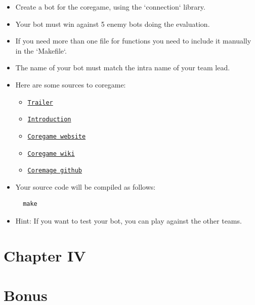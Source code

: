\documentclass[12pt]{article}
\begin{document}
\begin{itemize}
  \item Create a bot for the coregame, using the `connection` library.
  
  \item Your bot must win against 5 enemy bots doing the evaluation.
  
  \item If you need more than one file for functions you need to include it manually in the `Makefile`.
  
  \item The name of your bot must match the intra name of your team lead.
  
  \item Here are some sources to coregame:
  \begin{itemize}
    \item \href{https://youtu.be/gMmBgHnb8Nc?si=Thm0HOCfNIZbfCnI}{\texttt{Trailer}}
    \item \href{https://shattereddisk.github.io/rickroll/rickroll.mp4}{\texttt{Introduction}}
    \item \href{https://coregame.de}{\texttt{Coregame website}}
    \item \href{https://wiki.coregame.de}{\texttt{Coregame wiki}}
    \item \href{https://github.com/42core-team}{\texttt{Coremage github}}
  \end{itemize}
  
  \item Your source code will be compiled as follows:
  
  \begin{verbatim}
  make
  \end{verbatim}
  
  \item Hint: If you want to test your bot, you can play against the other teams.
\end{itemize}

\newpage

\section*{\LARGE Chapter IV}
\section*{\LARGE Bonus}
\end{document}
